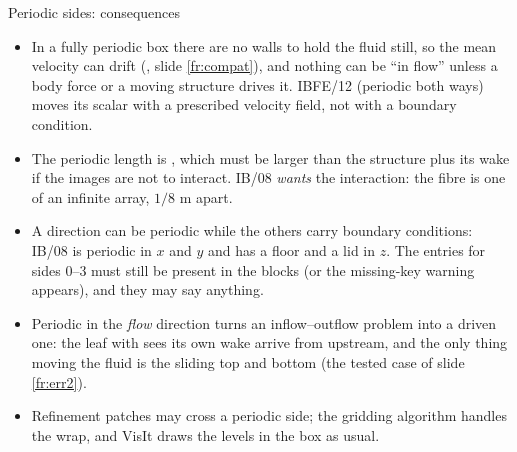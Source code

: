 \documentclass[aspectratio=169,11pt]{beamer}
\begin{document}
\begin{frame}{Periodic sides: consequences}
\label{fr:periodic2}
\small
\begin{itemize}
  \item In a fully periodic box there are no walls to hold the fluid still, so the mean velocity can drift (, slide \ref{fr:compat}), and nothing can be ``in flow'' unless a body force or a moving structure drives it. IBFE/12 (periodic both ways) moves its scalar with a prescribed velocity field, not with a boundary condition.
  \item The periodic length is , which must be larger than the structure plus its wake if the images are not to interact. IB/08 \emph{wants} the interaction: the fibre is one of an infinite array, $1/8$ m apart.
  \item A direction can be periodic while the others carry boundary conditions: IB/08 is periodic in $x$ and $y$ and has a floor and a lid in $z$. The entries for sides 0--3 must still be present in the blocks (or the missing-key warning appears), and they may say anything.
  \item Periodic in the \emph{flow} direction turns an inflow--outflow problem into a driven one: the leaf with  sees its own wake arrive from upstream, and the only thing moving the fluid is the sliding top and bottom (the tested case of slide \ref{fr:err2}).
  \item Refinement patches may cross a periodic side; the gridding algorithm handles the wrap, and VisIt draws the levels in the box as usual.
\end{itemize}
\end{frame}
\end{document}

